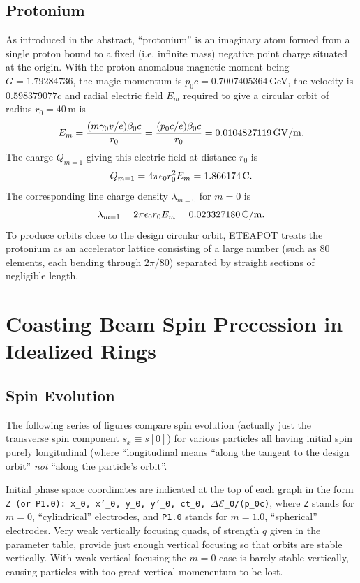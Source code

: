 \documentclass[]{article}
\begin{document}
\subsection{Protonium}
As introduced in the abstract, ``protonium'' is an imaginary atom
formed from a single proton bound to a fixed (i.e. infinite
mass) negative point charge situated at the origin. With the
proton anomalous magnetic moment being $G=1.79284736$, the magic
momentum is $p_0c=0.7007405364\,$GeV, the velocity is 
$0.598379077 c$ and radial electric field
$E_m$ required to give a circular orbit of radius $r_0=40\,$m is
%
\begin{equation}
E_m 
 = 
\frac{(m\gamma_0v/e)\beta_0c}{r_0} 
 =
\frac{(p_0c/e)\beta_0c}{r_0}
 =
0.0104827119\,{\rm GV/m}.
\label{eq:Protonium.1}
\end{equation}
% 
The charge $Q_{m=1}$ giving this electric field at distance $r_0$ is 
%
\begin{equation}
Q_{m=1}
 =
4\pi\epsilon_0r_0^2E_m
 =
1.866174\,{\rm C}.
\label{eq:Protonium.2}
\end{equation}
% 
The corresponding line charge density $\lambda_{m=0}$ for $m=0$ is  
%
\begin{equation}
\lambda_{m=1}
 =
2\pi\epsilon_0r_0E_m
 =
0.023327180\,{\rm C/m}.
\label{eq:Protonium.3}
\end{equation}
%
To produce orbits close to the design circular orbit, ETEAPOT
treats the protonium as an accelerator lattice consisting of
a large number (such as 80 elements, each bending through
$2\pi/80$) separated by straight sections of negligible length.

\section{Coasting Beam Spin Precession in Idealized Rings}
\subsection{Spin Evolution}
The following series of figures compare spin evolution 
(actually just the transverse spin component $s_x\equiv s[0]$) for
various particles all having initial spin purely longitudinal
(where ``longitudinal means ``along the tangent to the design orbit''
\emph{not} ``along the particle's orbit''.

Initial phase space coordinates are indicated at the top
of each graph in the form 
{\tt Z (or P1.0): x\_0, x'\_0, y\_0, y'\_0, ct\_0, 
$\Delta\mathcal{E}$\_0/(p\_0c)},
where {\tt Z} stands for $m=0$, ``cylindrical'' electrodes,
and {\tt P1.0} stands for $m=1.0$, ``spherical''
electrodes. Very weak vertically focusing quads, of strength $q$ 
given in the parameter table, provide just enough vertical focusing 
so that orbits are stable vertically.
With weak vertical focusing the $m=0$ case is barely stable 
vertically, causing particles with too great vertical momenentum
to be lost.
\end{document}
